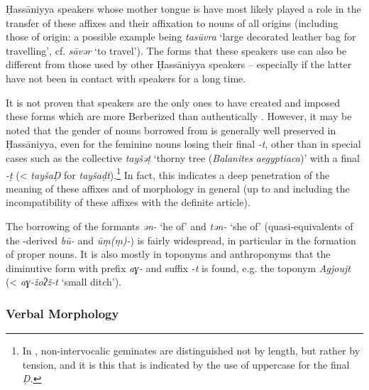 \documentclass[output=paper]{langsci/langscibook}
\begin{document}
Ḥassāniyya speakers whose mother tongue is  have most likely played a role in the {transfer} of these affixes and their affixation to nouns of all origins (including those of  origin: a possible example being \textit{tasūvra} ‘large decorated leather bag for travelling’, cf. \textit{sāvər} ‘to travel’). The forms that these speakers use can also be different from those used by other Ḥassāniyya speakers – especially if the latter have not been in contact with  speakers for a long time. 

It is not proven that  speakers are the only ones to have created and imposed these forms which are more Berberized than authentically . However, it may be noted that the {gender} of nouns borrowed from  is generally well preserved in Ḥassāniyya, even for the feminine nouns losing their final \textit{{}-t}, other than in special cases such as the {collective} \textit{tayšəṭ} ‘thorny tree (\textit{Balanites} \textit{aegyptiaca})’ with a final \textit{{}-ṭ} (<  \textit{tayšaḌ} for \textit{tayšaḍt}).\footnote{In , non-intervocalic geminates are distinguished not by length, but rather by tension, and it is this that is indicated by the use of uppercase for the final \textit{Ḍ.} } In fact, this indicates a deep penetration of the meaning of these affixes and of  morphology in general (up to and including the incompatibility of these affixes with the {definite} {article}). 

The borrowing of the formants \textit{ən-} ‘he of’ and \textit{tən-} ‘she of’ (quasi-equivalents of the -derived \textit{bū-} and \textit{ūṃ(ṃ)-}) is fairly widespread, in particular in the {formation} of proper nouns. It is also mostly in toponyms and anthroponyms that the {diminutive} form with prefix \textit{aɣ-} and suffix \textit{{}-t} is found, e.g. the toponym \textit{Agjoujt} (< \textit{aɣ-žoʔž-t} ‘small ditch’).

\subsubsection{Verbal Morphology} %

\label{sa}
\end{document}
